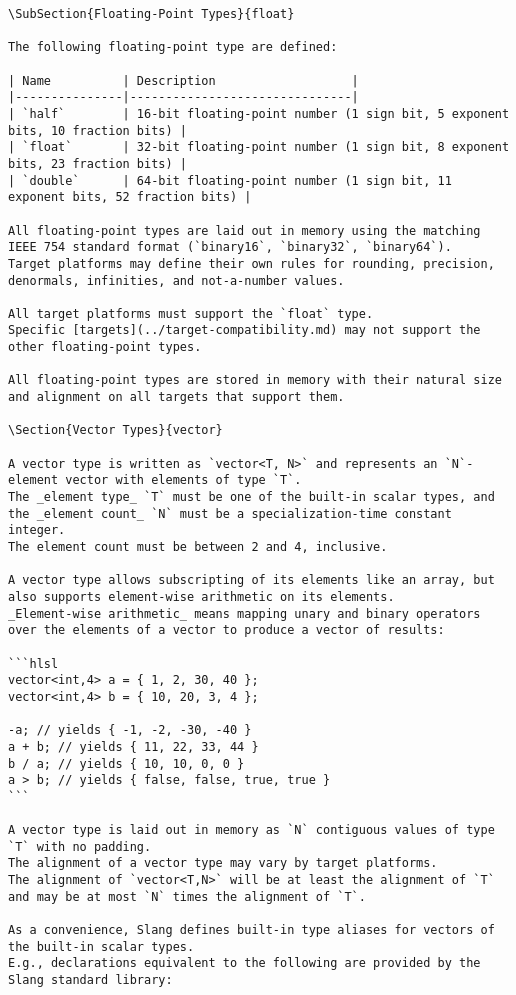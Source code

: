 \begin{verbatim}
\SubSection{Floating-Point Types}{float}

The following floating-point type are defined:

| Name          | Description                   |
|---------------|-------------------------------|
| `half`        | 16-bit floating-point number (1 sign bit, 5 exponent bits, 10 fraction bits) |
| `float`       | 32-bit floating-point number (1 sign bit, 8 exponent bits, 23 fraction bits) |
| `double`      | 64-bit floating-point number (1 sign bit, 11 exponent bits, 52 fraction bits) |

All floating-point types are laid out in memory using the matching IEEE 754 standard format (`binary16`, `binary32`, `binary64`).
Target platforms may define their own rules for rounding, precision, denormals, infinities, and not-a-number values.

All target platforms must support the `float` type.
Specific [targets](../target-compatibility.md) may not support the other floating-point types.

All floating-point types are stored in memory with their natural size and alignment on all targets that support them.

\Section{Vector Types}{vector}

A vector type is written as `vector<T, N>` and represents an `N`-element vector with elements of type `T`.
The _element type_ `T` must be one of the built-in scalar types, and the _element count_ `N` must be a specialization-time constant integer.
The element count must be between 2 and 4, inclusive.

A vector type allows subscripting of its elements like an array, but also supports element-wise arithmetic on its elements.
_Element-wise arithmetic_ means mapping unary and binary operators over the elements of a vector to produce a vector of results:

```hlsl
vector<int,4> a = { 1, 2, 30, 40 };
vector<int,4> b = { 10, 20, 3, 4 };

-a; // yields { -1, -2, -30, -40 }
a + b; // yields { 11, 22, 33, 44 }
b / a; // yields { 10, 10, 0, 0 }
a > b; // yields { false, false, true, true }
```

A vector type is laid out in memory as `N` contiguous values of type `T` with no padding.
The alignment of a vector type may vary by target platforms.
The alignment of `vector<T,N>` will be at least the alignment of `T` and may be at most `N` times the alignment of `T`.

As a convenience, Slang defines built-in type aliases for vectors of the built-in scalar types.
E.g., declarations equivalent to the following are provided by the Slang standard library:


\end{verbatim}
